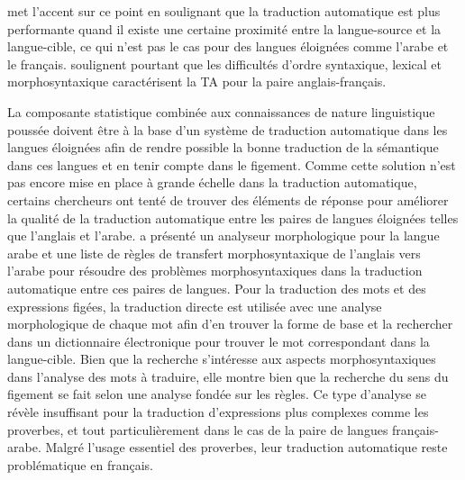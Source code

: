 \documentclass[french]{textolivre}
\begin{document}
\textcite{poibeau_traduire_2016} met l’accent sur ce point en soulignant que la traduction automatique est plus performante quand il existe une certaine proximité entre la langue-source et la langue-cible, ce qui n’est pas le cas pour des langues éloignées comme l’arabe et le français. \textcite{isabelle_challenge_2017} soulignent pourtant que les difficultés d’ordre syntaxique, lexical et morphosyntaxique caractérisent la TA pour la paire anglais-français.

La composante statistique combinée aux connaissances de nature linguistique poussée doivent être à la base d’un système de traduction automatique dans les langues éloignées afin de rendre possible la bonne traduction de la sémantique dans ces langues et en tenir compte dans le figement. Comme cette solution n’est pas encore mise en place à grande échelle dans la traduction automatique, certains chercheurs ont tenté de trouver des éléments de réponse pour améliorer la qualité de la traduction automatique entre les paires de langues éloignées telles que l’anglais et l’arabe. \textcite{bessou_contribution_2019} a présenté un analyseur morphologique pour la langue arabe et une liste de règles de transfert morphosyntaxique de l’anglais vers l’arabe pour résoudre des problèmes morphosyntaxiques dans la traduction automatique entre ces paires de langues. Pour la traduction des mots et des expressions figées, la traduction directe est utilisée avec une analyse morphologique de chaque mot afin d’en trouver la forme de base et la rechercher dans un dictionnaire électronique pour trouver le mot correspondant dans la langue-cible. Bien que la recherche s’intéresse aux aspects morphosyntaxiques dans l’analyse des mots à traduire, elle montre bien que la recherche du sens du figement se fait selon une analyse fondée sur les règles. Ce type d’analyse se révèle insuffisant pour la traduction d’expressions plus complexes comme les proverbes, et tout particulièrement dans le cas de la paire de langues français-arabe. Malgré l’usage essentiel des proverbes, leur traduction automatique reste problématique en français.
\end{document}
